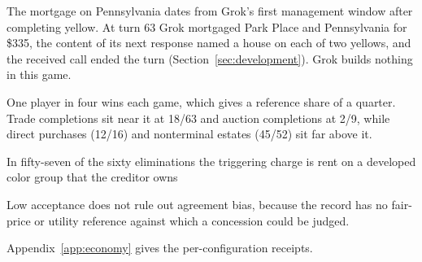 


The mortgage on Pennsylvania dates from Grok's first management window after completing yellow. At turn 63 Grok mortgaged Park Place and Pennsylvania for \$335, the content of its next response named a house on each of two yellows, and the received call ended the turn (Section~\ref{sec:development}). Grok builds nothing in this game.




One player in four wins each game, which gives a reference share of a quarter. Trade completions sit near it at 18/63 and auction completions at 2/9, while direct purchases (12/16) and nonterminal estates (45/52) sit far above it.

In fifty-seven of the sixty eliminations the triggering charge is rent on a developed color group that the creditor owns


Low acceptance does not rule out agreement bias, because the record has no fair-price or utility reference against which a concession could be judged.

Appendix~\ref{app:economy} gives the per-configuration receipts.
